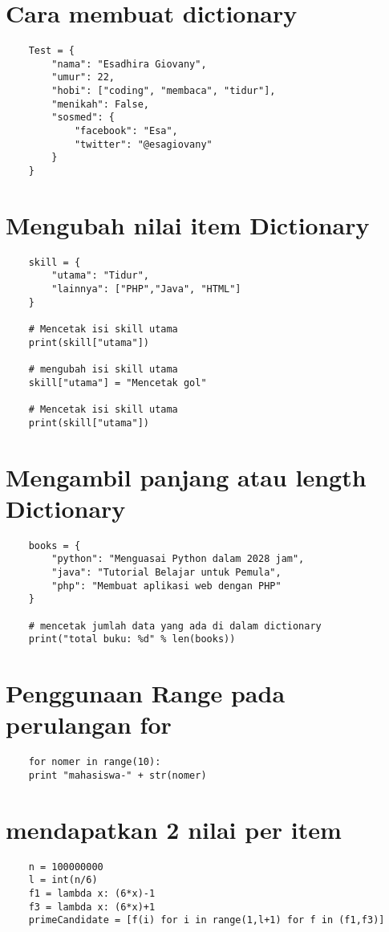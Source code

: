 \documentclass[12pt]{article} %
\begin{document}
\section{Cara membuat dictionary}
\begin{lstlisting}
	Test = {
	    "nama": "Esadhira Giovany",
	    "umur": 22,
	    "hobi": ["coding", "membaca", "tidur"],
	    "menikah": False,
	    "sosmed": {
	        "facebook": "Esa",
	        "twitter": "@esagiovany"
	    } 
	}
\end{lstlisting}

\section{Mengubah nilai item Dictionary}
\begin{lstlisting}
	skill = {
	    "utama": "Tidur",
	    "lainnya": ["PHP","Java", "HTML"]
	}
	
	# Mencetak isi skill utama
	print(skill["utama"])
	
	# mengubah isi skill utama
	skill["utama"] = "Mencetak gol"
	
	# Mencetak isi skill utama
	print(skill["utama"])
\end{lstlisting}

\section{Mengambil panjang atau length Dictionary}
\begin{lstlisting}
	books = {
	    "python": "Menguasai Python dalam 2028 jam",
	    "java": "Tutorial Belajar untuk Pemula",
	    "php": "Membuat aplikasi web dengan PHP"
	}
	
	# mencetak jumlah data yang ada di dalam dictionary
	print("total buku: %d" % len(books))
\end{lstlisting}

\section{Penggunaan Range pada perulangan for}
\begin{lstlisting}
	for nomer in range(10):
	print "mahasiswa-" + str(nomer)
\end{lstlisting}


\section{mendapatkan 2 nilai per item }
\begin{lstlisting}
	n = 100000000
	l = int(n/6)
	f1 = lambda x: (6*x)-1
	f3 = lambda x: (6*x)+1
	primeCandidate = [f(i) for i in range(1,l+1) for f in (f1,f3)]
\end{lstlisting}
\end{document}
